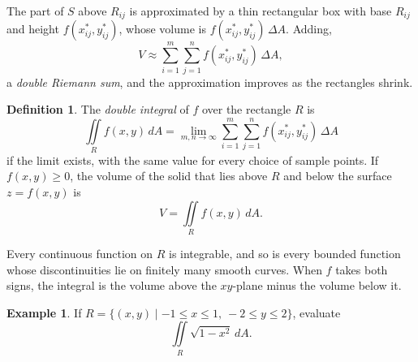 \documentclass[11pt,a4paper]{article}
\theoremstyle{definition}
\newtheorem{defn}[thm]{Definition}
\newtheorem{exa}[thm]{Example}
\begin{document}
\begin{figure}[H]
\centering
{}
\end{figure}

The part of $S$ above $R_{ij}$ is approximated by a thin rectangular box with
base $R_{ij}$ and height $f(x^*_{ij},y^*_{ij})$, whose volume is
$f(x^*_{ij},y^*_{ij})\,\Delta A$. Adding,
\[V \approx \sum^m_{i=1}\sum^n_{j=1}f(x^*_{ij},y^*_{ij})\,\Delta A ,\]
a \emph{double Riemann sum}, and the approximation improves as the rectangles
shrink.

\begin{defn}
\label{defn:doubleintegral}
The \emph{double integral} of $f$ over the rectangle $R$ is
\[\iint\limits_R f(x,y)\,dA = \lim_{m,n\to \infty}\sum^m_{i=1}\sum^n_{j=1}
f(x^*_{ij},y^*_{ij})\,\Delta A\]
if the limit exists, with the same value for every choice of sample points. If
$f(x,y)\geq 0$, the volume of the solid that lies above $R$ and below the
surface $z = f(x,y)$ is
\[V = \iint\limits_R f(x,y)\, dA .\]
\end{defn}

Every continuous function on $R$ is integrable, and so is every bounded function
whose discontinuities lie on finitely many smooth curves. When $f$ takes both
signs, the integral is the volume above the $xy$-plane minus the volume below
it.

\begin{exa}
\label{ex:halfcylinder}
If $R = \{ (x,y) \mid -1\leq x \leq 1,\ -2\leq y\leq 2\}$, evaluate
\[\iint\limits_R \sqrt{1 - x^2}\, dA .\]
\end{exa}
\end{document}

